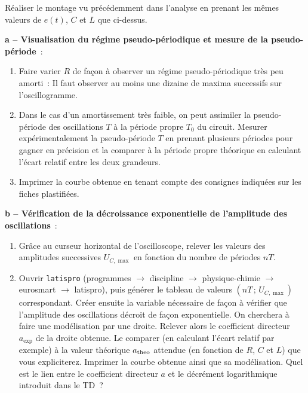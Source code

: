 \documentclass[a4paper, 11pt, final, garamond]{book}
\begin{document}
Réaliser le montage vu précédemment dans l'analyse en prenant les mêmes valeurs
de $e(t)$, $C$ et $L$ que ci-dessus.

\textbf{a  -- Visualisation du régime pseudo-périodique et mesure de la
pseudo-période}~:

\begin{enumerate}
    \item Faire varier $R$ de façon à observer un régime pseudo-périodique très
        peu amorti~: Il faut observer au moins une dizaine de maxima successifs
        sur l'oscillogramme.
    \item Dans le cas d'un amortissement très faible, on peut assimiler la
        pseudo-période des oscillations $T$ à la période propre $T_0$ du
        circuit. Mesurer expérimentalement la pseudo-période $T$ en prenant
        plusieurs périodes pour gagner en précision et la comparer à la période
        propre théorique en calculant l'écart relatif entre les deux grandeurs.
    \item Imprimer la courbe obtenue en tenant compte des consignes indiquées
        sur les fiches plastifiées.
\end{enumerate}

\textbf{
    b -- Vérification de la décroissance exponentielle de l'amplitude des
oscillations}~:

\begin{enumerate}
    \item Grâce au curseur horizontal de l'oscilloscope, relever les valeurs des
        amplitudes successives $U_{C,\max}$ en fonction du nombre de périodes
        $nT$.

    \item Ouvrir \texttt{latispro} (programmes $\rightarrow$ discipline
        $\rightarrow$ physique-chimie $\rightarrow$ eurosmart $\rightarrow$
        latispro), puis générer le tableau de valeurs $(nT \, ; \, U_{C,\max})$
        correspondant. Créer ensuite la variable nécessaire de façon à vérifier
        que l'amplitude des oscillations décroit de façon exponentielle. On
        cherchera à faire une modélisation par une droite. Relever alors le
        coefficient directeur $a_{\exp}$ de la droite obtenue. Le comparer (en
        calculant l'écart relatif par exemple) à la valeur théorique $a_{\rm
        theo}$ attendue (en fonction de $R$, $C$ et $L$) que vous expliciterez.
        Imprimer la courbe obtenue ainsi que sa modélisation. Quel est le lien
        entre le coefficient directeur $a$ et le décrément logarithmique
        introduit dans le TD~? 
\end{enumerate}
\end{document}
